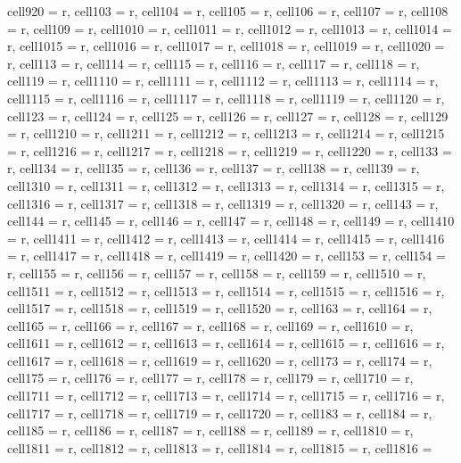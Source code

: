 \documentclass[journal]{IEEEtran}
\begin{document}
\begin{table}
\begin{adjustbox}{width=\textwidth}
\begin{tblr}
{cell{9}{20} = {r},  cell{10}{3} = {r},  cell{10}{4} = {r},  cell{10}{5} = {r},  cell{10}{6} = {r},  cell{10}{7} = {r},  cell{10}{8} = {r},  cell{10}{9} = {r},  cell{10}{10} = {r},  cell{10}{11} = {r},  cell{10}{12} = {r},  cell{10}{13} = {r},  cell{10}{14} = {r},  cell{10}{15} = {r},  cell{10}{16} = {r},  cell{10}{17} = {r},  cell{10}{18} = {r},  cell{10}{19} = {r},  cell{10}{20} = {r},  cell{11}{3} = {r},  cell{11}{4} = {r},  cell{11}{5} = {r},  cell{11}{6} = {r},  cell{11}{7} = {r},  cell{11}{8} = {r},  cell{11}{9} = {r},  cell{11}{10} = {r},  cell{11}{11} = {r},  cell{11}{12} = {r},  cell{11}{13} = {r},  cell{11}{14} = {r},  cell{11}{15} = {r},  cell{11}{16} = {r},  cell{11}{17} = {r},  cell{11}{18} = {r},  cell{11}{19} = {r},  cell{11}{20} = {r},  cell{12}{3} = {r},  cell{12}{4} = {r},  cell{12}{5} = {r},  cell{12}{6} = {r},  cell{12}{7} = {r},  cell{12}{8} = {r},  cell{12}{9} = {r},  cell{12}{10} = {r},  cell{12}{11} = {r},  cell{12}{12} = {r},  cell{12}{13} = {r},  cell{12}{14} = {r},  cell{12}{15} = {r},  cell{12}{16} = {r},  cell{12}{17} = {r},  cell{12}{18} = {r},  cell{12}{19} = {r},  cell{12}{20} = {r},  cell{13}{3} = {r},  cell{13}{4} = {r},  cell{13}{5} = {r},  cell{13}{6} = {r},  cell{13}{7} = {r},  cell{13}{8} = {r},  cell{13}{9} = {r},  cell{13}{10} = {r},  cell{13}{11} = {r},  cell{13}{12} = {r},  cell{13}{13} = {r},  cell{13}{14} = {r},  cell{13}{15} = {r},  cell{13}{16} = {r},  cell{13}{17} = {r},  cell{13}{18} = {r},  cell{13}{19} = {r},  cell{13}{20} = {r},  cell{14}{3} = {r},  cell{14}{4} = {r},  cell{14}{5} = {r},  cell{14}{6} = {r},  cell{14}{7} = {r},  cell{14}{8} = {r},  cell{14}{9} = {r},  cell{14}{10} = {r},  cell{14}{11} = {r},  cell{14}{12} = {r},  cell{14}{13} = {r},  cell{14}{14} = {r},  cell{14}{15} = {r},  cell{14}{16} = {r},  cell{14}{17} = {r},  cell{14}{18} = {r},  cell{14}{19} = {r},  cell{14}{20} = {r},  cell{15}{3} = {r},  cell{15}{4} = {r},  cell{15}{5} = {r},  cell{15}{6} = {r},  cell{15}{7} = {r},  cell{15}{8} = {r},  cell{15}{9} = {r},  cell{15}{10} = {r},  cell{15}{11} = {r},  cell{15}{12} = {r},  cell{15}{13} = {r},  cell{15}{14} = {r},  cell{15}{15} = {r},  cell{15}{16} = {r},  cell{15}{17} = {r},  cell{15}{18} = {r},  cell{15}{19} = {r},  cell{15}{20} = {r},  cell{16}{3} = {r},  cell{16}{4} = {r},  cell{16}{5} = {r},  cell{16}{6} = {r},  cell{16}{7} = {r},  cell{16}{8} = {r},  cell{16}{9} = {r},  cell{16}{10} = {r},  cell{16}{11} = {r},  cell{16}{12} = {r},  cell{16}{13} = {r},  cell{16}{14} = {r},  cell{16}{15} = {r},  cell{16}{16} = {r},  cell{16}{17} = {r},  cell{16}{18} = {r},  cell{16}{19} = {r},  cell{16}{20} = {r},  cell{17}{3} = {r},  cell{17}{4} = {r},  cell{17}{5} = {r},  cell{17}{6} = {r},  cell{17}{7} = {r},  cell{17}{8} = {r},  cell{17}{9} = {r},  cell{17}{10} = {r},  cell{17}{11} = {r},  cell{17}{12} = {r},  cell{17}{13} = {r},  cell{17}{14} = {r},  cell{17}{15} = {r},  cell{17}{16} = {r},  cell{17}{17} = {r},  cell{17}{18} = {r},  cell{17}{19} = {r},  cell{17}{20} = {r},  cell{18}{3} = {r},  cell{18}{4} = {r},  cell{18}{5} = {r},  cell{18}{6} = {r},  cell{18}{7} = {r},  cell{18}{8} = {r},  cell{18}{9} = {r},  cell{18}{10} = {r},  cell{18}{11} = {r},  cell{18}{12} = {r},  cell{18}{13} = {r},  cell{18}{14} = {r},  cell{18}{15} = {r},  cell{18}{16} = }
\end{tblr}
\end{adjustbox}
\end{table}
\end{document}
